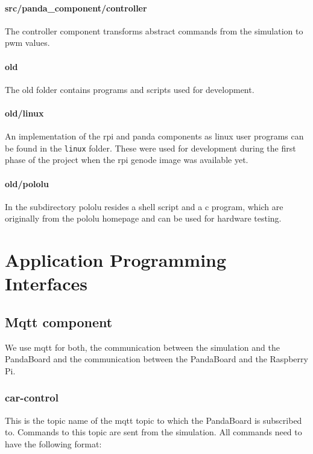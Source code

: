 \paragraph{src/panda\_component/controller}
The controller component transforms abstract commands from the simulation to pwm values.

\paragraph{old}
The old folder contains programs and scripts used for development.

\paragraph{old/linux}
An implementation of the rpi and panda components as linux user programs can be found in the \texttt{linux} folder.
These were used for development during the first phase of the project when the rpi genode image was available yet.

\paragraph{old/pololu}
In the subdirectory pololu resides a shell script and a c program, which are originally from the pololu homepage and can be used for hardware testing.

\newpage
\section{Application Programming Interfaces}
\label{sec:api}

\subsection{Mqtt component}
We use mqtt for both, the communication between the simulation and the PandaBoard and the communication between the PandaBoard and the Raspberry Pi.

\subsubsection{car-control}
\label{sec:mqtt-car-control}
This is the topic name of the mqtt topic to which the PandaBoard is subscribed to. Commands to this topic are sent from the simulation. All commands need to have the following format: \\

